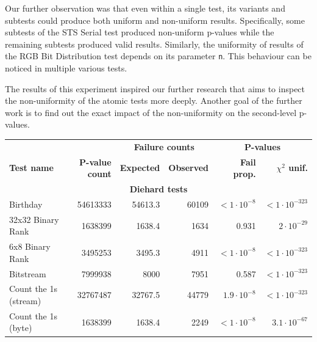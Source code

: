 \documentclass[
	digital,    %
	oneside,
	color,
	11pt,
	nocover,
	notable,
	nolof,
	nolot,
]{fithesis3}
\newcommand{\rd}{\cellcolor{red!40}}
\theoremstyle{definition}
\theoremstyle{remark}
\begin{document}
Our further observation was that even within a single test, its variants and subtests could produce both uniform and non-uniform results. Specifically, some subtests of the STS Serial test produced non-uniform p-values while the remaining subtests produced valid results. Similarly, the uniformity of results of the RGB Bit Distribution test depends on its parameter \texttt{n}. This behaviour can be noticed in multiple various tests.

The results of this experiment inspired our further research that aims to inspect the non-uniformity of the atomic tests more deeply. Another goal of the further work is to find out the exact impact of the non-uniformity on the second-level p-values.

\newpage

\begin{table}[H]
\begin{nomar}
\centering
\scalebox{.85}
{
\begin{tabular}{@{}lrrrrr@{}} \toprule
                               &                   & \multicolumn{2}{c}{\textbf{Failure counts}} & \multicolumn{2}{c}{\textbf{P-values}} \\ \cmidrule(lr){3-4} \cmidrule(lr){5-6}
\textbf{Test name}             & \textbf{P-value count}     & \textbf{Expected}      & \textbf{Observed}      & \textbf{Fail prop.}        & \textbf{$\chi^2$ unif.}      \\ \midrule
\multicolumn{6}{c}{\textbf{Diehard tests}} \\ \midrule
Birthday                       & 54613333          & 54613.3       & 60109         & $<1\cdot 10^{-8}$  \rd & $<1\cdot 10^{-323}$   \rd \\
32x32 Binary Rank              & 1638399           & 1638.4        & 1634          & 0.931                  & $2 \cdot 10^{-29}$    \rd \\
6x8 Binary Rank                & 3495253           & 3495.3        & 4911          & $<1\cdot 10^{-8}$  \rd & $<1\cdot 10^{-323}$   \rd \\
Bitstream                      & 7999938           & 8000          & 7951          & 0.587                  & $<1\cdot 10^{-323}$   \rd \\
Count the 1s (stream)          & 32767487          & 32767.5       & 44779         & $1.9\cdot 10^{-8}$ \rd & $<1\cdot 10^{-323}$   \rd \\
Count the 1s (byte)            & 1638399           & 1638.4        & 2249          & $<1\cdot 10^{-8}$  \rd & $3.1 \cdot 10^{-67}$  \rd \\

\end{tabular}}
\end{nomar}
\end{table}
\end{document}
